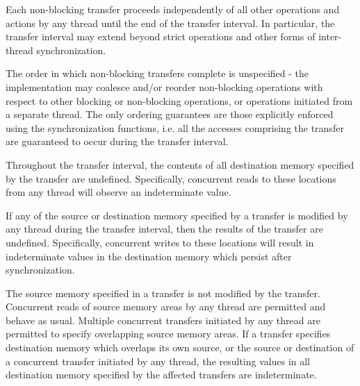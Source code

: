 \np Each non-blocking transfer proceeds independently of all other operations and actions
by any thread until the end of the transfer interval. In particular, the transfer 
interval may extend beyond strict operations and other forms of inter-thread synchronization.

\np The order in which non-blocking transfers complete is unspecified - the implementation may
coalesce and/or reorder non-blocking operations with respect to other blocking or non-blocking operations,
or operations initiated from a separate thread. The only ordering guarantees are those
explicitly enforced using the synchronization functions, i.e. all the accesses comprising the 
transfer are guaranteed to occur during the transfer interval.

\np Throughout the transfer interval, the contents of all destination memory specified by the 
transfer are undefined. Specifically, concurrent reads to these locations from any
thread will observe an indeterminate value.

\np If any of the source or destination memory specified by a transfer is modified by any thread
during the transfer interval, then the results of the transfer are undefined. Specifically, 
concurrent writes to these locations will result in indeterminate values in the destination
memory which persist after synchronization.

\np The source memory specified in a transfer is not modified by the transfer.
Concurrent reads of source memory areas by any thread are permitted and behave as usual.
Multiple concurrent transfers initiated by any thread are permitted to specify overlapping source memory areas.
If a transfer specifies destination memory which overlaps its own source, or the source or destination of a 
concurrent transfer initiated by any thread, the resulting values in all destination memory specified
by the affected transfers are indeterminate.


